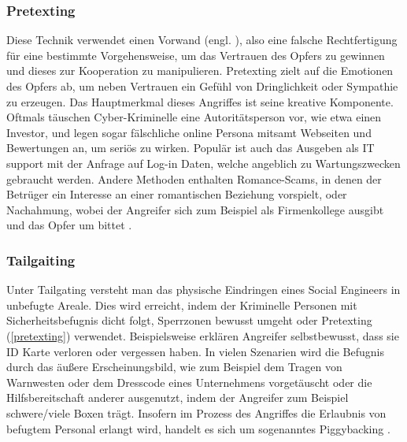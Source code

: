 \subsubsection{Pretexting}
\label{pretexting}
Diese Technik verwendet einen Vorwand (engl. ), also eine falsche Rechtfertigung für eine bestimmte Vorgehensweise, um das Vertrauen des
Opfers zu gewinnen und dieses zur Kooperation zu manipulieren. Pretexting zielt auf die Emotionen des Opfers ab, um neben Vertrauen ein Gefühl von
Dringlichkeit oder Sympathie zu erzeugen. Das Hauptmerkmal dieses Angriffes ist seine kreative Komponente. Oftmals täuschen Cyber-Kriminelle
eine Autoritätsperson vor, wie etwa einen Investor, und legen sogar fälschliche online Persona mitsamt Webseiten und Bewertungen an, um seriös zu wirken.
Populär ist auch das Ausgeben als IT support mit der Anfrage auf Log-in Daten, welche angeblich zu Wartungszwecken gebraucht werden.
Andere Methoden enthalten Romance-Scams, in denen der Betrüger ein Interesse an einer romantischen Beziehung vorspielt, oder Nachahmung, wobei der
Angreifer sich zum Beispiel als Firmenkollege ausgibt und das Opfer um  bittet .

\subsubsection{Tailgaiting}
\label{tailgating}
Unter Tailgating versteht man das physische Eindringen eines Social Engineers in unbefugte Areale.
Dies wird erreicht, indem der Kriminelle Personen mit Sicherheitsbefugnis dicht folgt, Sperrzonen bewusst umgeht oder Pretexting (\autoref{pretexting})
verwendet. Beispielsweise erklären Angreifer selbstbewusst, dass sie ID Karte verloren oder vergessen haben. In vielen Szenarien wird die
Befugnis durch das äußere Erscheinungsbild, wie zum Beispiel dem Tragen von Warnwesten oder dem Dresscode eines Unternehmens vorgetäuscht oder die Hilfsbereitschaft anderer ausgenutzt,
indem der Angreifer zum Beispiel schwere/viele Boxen trägt. Insofern im Prozess des Angriffes die Erlaubnis von befugtem Personal erlangt wird, handelt es sich um sogenanntes Piggybacking .

